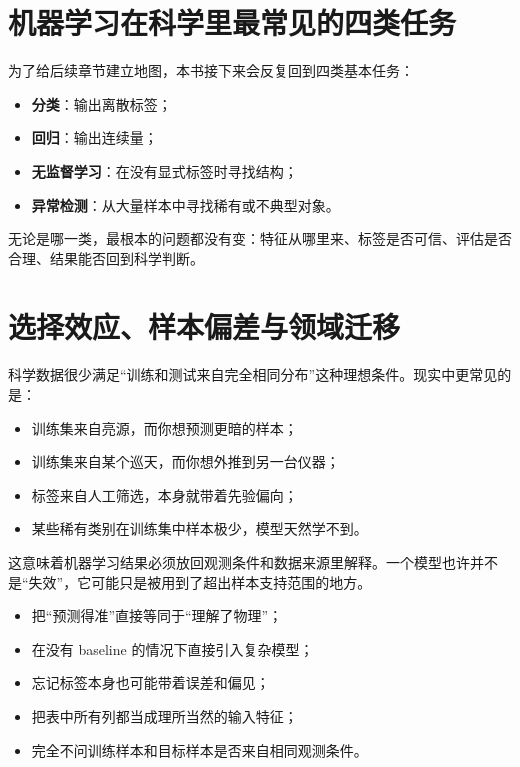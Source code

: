 \section{机器学习在科学里最常见的四类任务}

为了给后续章节建立地图，本书接下来会反复回到四类基本任务：

\begin{itemize}
    \item \textbf{分类}：输出离散标签；
    \item \textbf{回归}：输出连续量；
    \item \textbf{无监督学习}：在没有显式标签时寻找结构；
    \item \textbf{异常检测}：从大量样本中寻找稀有或不典型对象。
\end{itemize}

无论是哪一类，最根本的问题都没有变：特征从哪里来、标签是否可信、评估是否合理、结果能否回到科学判断。

\section{选择效应、样本偏差与领域迁移}

科学数据很少满足“训练和测试来自完全相同分布”这种理想条件。现实中更常见的是：

\begin{itemize}
    \item 训练集来自亮源，而你想预测更暗的样本；
    \item 训练集来自某个巡天，而你想外推到另一台仪器；
    \item 标签来自人工筛选，本身就带着先验偏向；
    \item 某些稀有类别在训练集中样本极少，模型天然学不到。
\end{itemize}

这意味着机器学习结果必须放回观测条件和数据来源里解释。一个模型也许并不是“失效”，它可能只是被用到了超出样本支持范围的地方。

\begin{warnbox}[进入机器学习前最常见的概念错误]
\begin{itemize}
    \item 把“预测得准”直接等同于“理解了物理”；
    \item 在没有 baseline 的情况下直接引入复杂模型；
    \item 忘记标签本身也可能带着误差和偏见；
    \item 把表中所有列都当成理所当然的输入特征；
    \item 完全不问训练样本和目标样本是否来自相同观测条件。
\end{itemize}
\end{warnbox}

